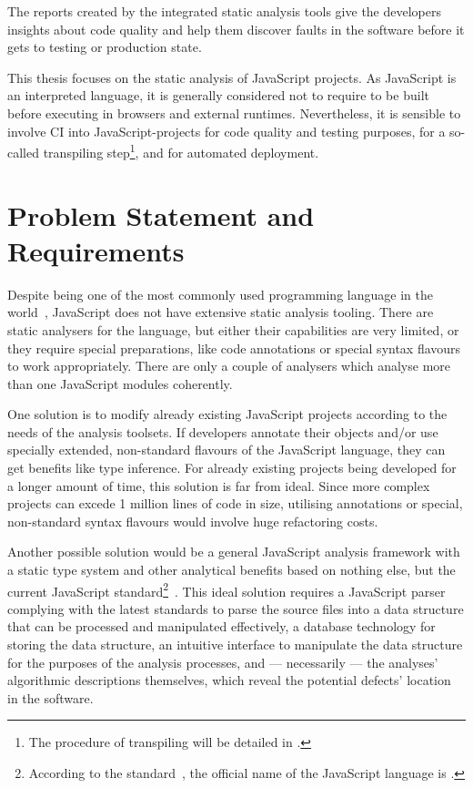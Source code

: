The reports created by the integrated static analysis tools give the developers insights about code quality and help them discover faults in the software before it gets to testing or production state.

This thesis focuses on the static analysis of JavaScript projects. As JavaScript is an interpreted language, it is generally considered not to require to be built before executing in browsers and external runtimes. Nevertheless, it is sensible to involve CI into JavaScript-projects for code quality and testing purposes, for a so-called transpiling step\footnote{The procedure of transpiling will be detailed in .}, and for automated deployment.


\section{Problem Statement and Requirements}

Despite being one of the most commonly used programming language in the world~\cite{javascriptstackoverflow}, JavaScript does not have extensive static analysis tooling. There are static analysers for the language, but either their capabilities are very limited, or they require special preparations, like code annotations or special syntax flavours to work appropriately. There are only a couple of analysers which analyse more than one JavaScript modules coherently.

One solution is to modify already existing JavaScript projects according to the needs of the analysis toolsets. If developers annotate their objects and/or use specially extended, non-standard flavours of the JavaScript language, they can get benefits like type inference. For already existing projects being developed for a longer amount of time, this solution is far from ideal. Since more complex projects can excede 1 million lines of code in size, utilising annotations or special, non-standard syntax flavours would involve huge refactoring costs.

Another possible solution would be a general JavaScript analysis framework with a static type system and other analytical benefits based on nothing else, but the current JavaScript standard\footnote{According to the standard~\cite{ecmascriptstandard}, the official name of the JavaScript language is \es.}~\cite{ecmascriptstandard}. This ideal solution requires a JavaScript parser complying with the latest \es standards to parse the source files into a data structure that can be processed and manipulated effectively, a database technology for storing the data structure, an intuitive interface to manipulate the data structure for the purposes of the analysis processes, and — necessarily — the analyses' algorithmic descriptions themselves, which reveal the potential defects' location in the software.

